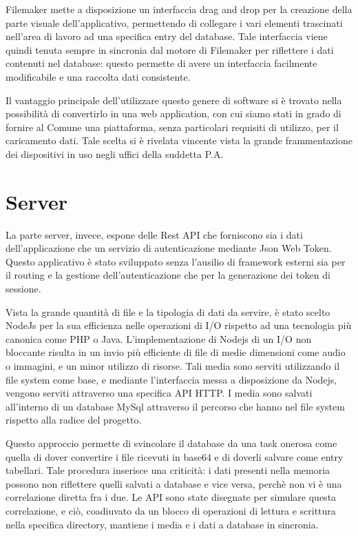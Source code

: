 Filemaker mette a disposizione un interfaccia drag and drop per la creazione della parte visuale dell'applicativo, permettendo di collegare i vari elementi trascinati nell'area di lavoro ad una specifica entry del database. Tale interfaccia viene quindi tenuta sempre in sincronia dal motore di Filemaker per riflettere i dati contenuti nel database: questo permette di avere un interfaccia facilmente modificabile e una raccolta dati consistente.\vspace{5mm}

Il vantaggio principale dell'utilizzare questo genere di software si è trovato nella possibilità di convertirlo in una web application, con cui siamo stati in grado di fornire al Comune una piattaforma, senza particolari requisiti di utilizzo, per il caricamento dati. Tale scelta si è rivelata vincente vista la grande frammentazione dei dispositivi in uso negli uffici della suddetta P.A.

\section{Server}\vspace{5mm}
	
La parte server, invece, espone delle Rest API che forniscono sia i dati dell'applicazione che un servizio di autenticazione mediante Json Web Token\cite{JWT}. Questo applicativo è stato sviluppato senza l’ausilio di framework esterni sia per il routing e la gestione dell’autenticazione che per la generazione dei token di sessione.\vspace{5mm}

 Vista la grande quantità di file e la tipologia di dati da servire, è stato scelto NodeJs per la sua efficienza nelle operazioni di I/O rispetto ad una tecnologia più canonica come PHP\cite{PHP} o Java\cite{Java}. L'implementazione di Nodejs di un I/O non bloccante\cite{BlockingVsNonBlocking} risulta in un invio più efficiente di file di medie dimensioni come audio o immagini, e un minor utilizzo di risorse. Tali media sono serviti utilizzando il file system come base, e mediante l'interfaccia messa a disposizione da Nodejs, vengono serviti attraverso una specifica API HTTP. I media sono salvati all'interno di un database MySql attraverso il percorso che hanno nel file system rispetto alla radice del progetto.\vspace{5mm}
 
  Questo approccio permette di svincolare il database da una task onerosa come quella di dover convertire i file ricevuti in base64 e di doverli salvare come entry tabellari. Tale procedura inserisce una criticità: i dati presenti nella memoria possono non riflettere quelli salvati a database e vice versa, perchè non vi è una correlazione diretta fra i due. Le API sono state disegnate per simulare questa correlazione, e ciò, coadiuvato da un blocco di operazioni di lettura e scrittura nella specifica directory, mantiene i media e i dati a database in sincronia. \vspace{5mm}

